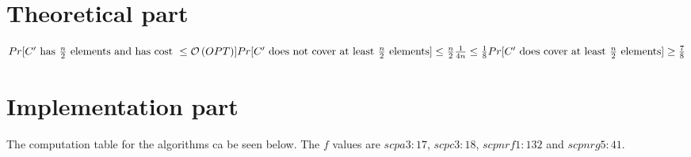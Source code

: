 \section{Theoretical part}
\begin{math}
Pr[C'\text{ has } \frac{n}{2} \text{ elements and has cost } \leq \mathcal{O}\left(OPT\right)]\\
\\
Pr[C' \text{ does not cover at least } \frac{n}{2} \text{ elements}] \leq \frac{n}{2} \frac{1}{4n} \leq \frac{1}{8}\\
\\
Pr[C' \text{ does cover at least } \frac{n}{2} \text{ elements}] \geq \frac{7}{8}
\end{math}

\section{Implementation part}
The computation table for the algorithms ca be seen below. The $f$ values are $scpa3: 17$, $scpc3: 18$, $scpnrf1: 132$ and $scpnrg5: 41$.


